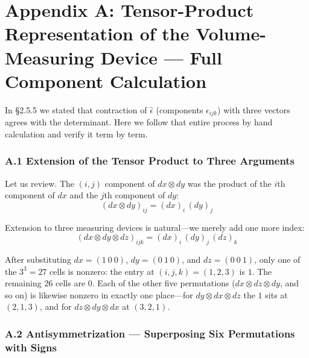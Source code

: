 \documentclass[a4paper,12pt,openany]{book}
\begin{document}
\par\vspace{0.35em}\par

\hypertarget{appendix-a-tensor-product-representation-of-the-volume-measuring-device-full-component-calculation}{%
\section{Appendix A: Tensor-Product Representation of the
Volume-Measuring Device — Full Component
Calculation}\label{appendix-a-tensor-product-representation-of-the-volume-measuring-device-full-component-calculation}}

In §2.5.5 we stated that contraction of \(\widehat{\epsilon}\)
(components \(\epsilon_{ijk}\)) with three vectors agrees with the
determinant. Here we follow that entire process by hand calculation and
verify it term by term.

\hypertarget{a.1-extension-of-the-tensor-product-to-three-arguments}{%
\subsubsection*{A.1 Extension of the Tensor Product to Three
Arguments}\label{a.1-extension-of-the-tensor-product-to-three-arguments}}

Let us review. The \((i,j)\) component of \(dx \otimes dy\) was the
product of the \(i\)th component of \(dx\) and the \(j\)th component of
\(dy\): \[(dx \otimes dy)_{ij} = (dx)_i\,(dy)_j\]

Extension to three measuring devices is natural—we merely add one more
index: \[(dx \otimes dy \otimes dz)_{ijk} = (dx)_i\,(dy)_j\,(dz)_k\]

After substituting \(dx=(1\ 0\ 0)\), \(dy=(0\ 1\ 0)\), and
\(dz=(0\ 0\ 1)\), only one of the \(3^3=27\) cells is nonzero: the entry
at \((i,j,k)=(1,2,3)\) is \(1\). The remaining 26 cells are \(0\). Each
of the other five permutations (\(dx \otimes dz \otimes dy\), and so on)
is likewise nonzero in exactly one place—for
\(dy \otimes dx \otimes dz\) the \(1\) sits at \((2,1,3)\), and for
\(dz \otimes dy \otimes dx\) at \((3,2,1)\).

\hypertarget{a.2-antisymmetrization-superposing-six-permutations-with-signs}{%
\subsubsection*{A.2 Antisymmetrization — Superposing Six Permutations
with
Signs}\label{a.2-antisymmetrization-superposing-six-permutations-with-signs}}
\end{document}
